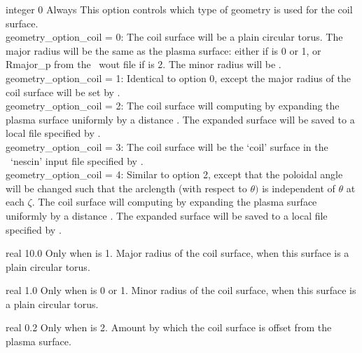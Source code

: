 {integer}
{0}
{Always}
{This option controls which type of geometry is used for the coil surface.\\

{\ttfamily geometry\_option\_coil} = 0: The coil surface will be a plain circular torus. The major radius will be the 
same as the plasma surface: either  if  is 0 or 1, or {\ttfamily Rmajor\_p} from the \vmec~{\ttfamily wout} file
if   is 2.
     The minor radius will be .\\

{\ttfamily geometry\_option\_coil} = 1: Identical to option 0, except the major radius of the coil surface will be set by .\\

{\ttfamily geometry\_option\_coil} = 2: The coil surface will computing by expanding the plasma surface uniformly by a distance . The expanded surface will be saved to a local file specified by . \\

{\ttfamily geometry\_option\_coil} = 3: The coil surface will be the `coil' surface in the \nescoil~`nescin' input file specified by . \\

{\ttfamily geometry\_option\_coil} = 4: Similar to option 2, except that the poloidal angle will be changed such that the arclength (with respect to $\theta)$ is independent of $\theta$ at each $\zeta$. The coil surface will computing by expanding the plasma surface uniformly by a distance . The expanded surface will be saved to a local file specified by . \\
}

\myhrule

{real}
{10.0}
{Only when  is 1.}
{Major radius of the coil surface, when this surface is a plain circular torus.}

\myhrule

{real}
{1.0}
{Only when  is 0 or 1.}
{Minor radius of the coil surface, when this surface is a plain circular torus.}


\myhrule

{real}
{0.2}
{Only when  is 2.}
{Amount by which the coil surface is offset from the plasma surface.}


